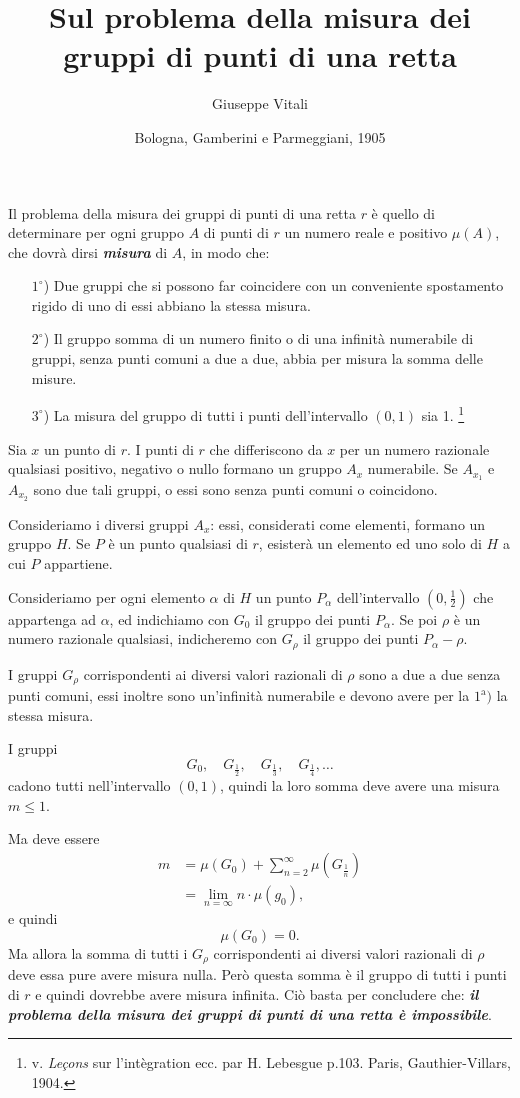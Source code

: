 \documentclass{article}
\title{Sul problema della misura dei gruppi di punti di una retta}
\author{Giuseppe Vitali}
\date{Bologna, Gamberini e Parmeggiani, 1905}
\begin{document}
\maketitle

Il problema della misura dei gruppi di punti di una retta $r$ è quello di determinare per ogni gruppo $A$ di punti di $r$ un numero reale e positivo $\mu(A)$, che dovrà dirsi \emph{\bfseries misura} di $A$, in modo che:

\begin{itemize}
	\item[$1^\circ$)] Due gruppi che si possono far coincidere con un conveniente spostamento rigido di uno di essi abbiano la stessa misura.
	\item[$2^\circ$)] Il gruppo somma di un numero finito o di una infinità numerabile di gruppi, senza punti comuni a due a due, abbia per misura la somma delle misure.
	\item[$3^\circ$)] La misura del gruppo di tutti i punti dell'intervallo $(0,1)$ sia 1. \footnote{ v. {\em Le\c cons} sur l'int\`egration ecc. par H. Lebesgue p.103. Paris, Gauthier-Villars, 1904.}
\end{itemize}

Sia $x$ un punto di $r$. I punti di $r$ che differiscono da $x$ per un numero razionale qualsiasi positivo, negativo o nullo formano un gruppo $A_x$ numerabile. Se $A_{x_1}$ e $A_{x_2}$ sono due tali gruppi, o essi sono senza punti comuni o coincidono.

Consideriamo i diversi gruppi $A_x$: essi, considerati come elementi, formano un gruppo $H$. Se $P$ è un punto qualsiasi di $r$, esisterà un elemento ed uno solo di $H$ a cui $P$ appartiene.

Consideriamo per ogni elemento $\alpha$ di $H$ un punto $P_\alpha$ dell'intervallo $(0,\frac12)$ che appartenga ad $\alpha$, ed indichiamo con $G_0$ il gruppo dei punti $P_\alpha$. Se poi $\rho$ è un numero razionale qualsiasi, indicheremo con $G_\rho$ il gruppo dei punti $P_\alpha-\rho$.

I gruppi $G_\rho$ corrispondenti ai diversi valori razionali di $\rho$ sono a due a due senza punti comuni, essi inoltre sono un'infinità numerabile e devono avere per la $1^\textrm{a})$ la stessa misura.

I gruppi
\[
	G_0, \quad G_{\frac12}, \quad G_{\frac13}, \quad G_{\frac14}, \dots
\]
cadono tutti nell'intervallo $(0,1)$, quindi la loro somma deve avere una misura $m\leq1$.

Ma deve essere
\begin{align*}
	m &= \mu(G_0) + \sum_{n=2}^\infty \mu\left(G_{\frac1n}\right) \\
		&= \lim_{n=\infty} n\cdot\mu(g_0),
\end{align*}
e quindi
\[
	\mu(G_0)=0.
\]
Ma allora la somma di tutti i $G_\rho$ corrispondenti ai diversi valori razionali di $\rho$ deve essa pure avere misura nulla. Però questa somma è il gruppo di tutti i punti di $r$ e quindi dovrebbe avere misura infinita. Ciò basta per concludere che: \emph{\bfseries il problema della misura dei gruppi di punti di una retta è impossibile}.
\end{document}
